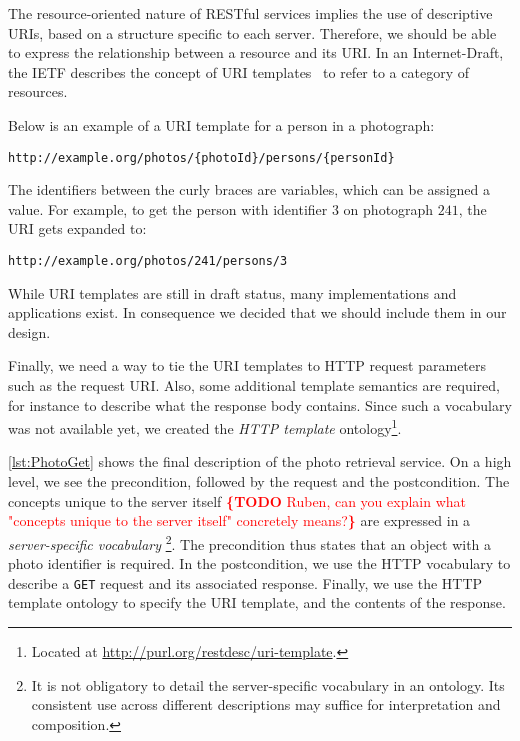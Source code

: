 \documentclass[runningheads,a4paper, twocolumn]{llncs}
\newcommand{\todo}[1]{\noindent\textcolor{red}{{\bf \{TODO} #1{\bf \}}}}
\begin{document}
The resource-oriented nature of RESTful services implies the use of descriptive URIs, based on a structure specific to each server. Therefore, we should be able to express the relationship between a resource and its URI. In an Internet-Draft, the IETF describes the concept of URI templates~\cite{URITemplate} to refer to a category of resources.

\needspace{2em} Below is an example of a URI template for a person in a photograph:
\begin{Verbatim}
http://example.org/photos/{photoId}/persons/{personId}
\end{Verbatim}
The identifiers between the curly braces are variables, which can be assigned a value. For example, to get the person with identifier $3$ on photograph $241$, the URI gets expanded to:
\begin{Verbatim}
http://example.org/photos/241/persons/3
\end{Verbatim}

While URI templates are still in draft status, many implementations and applications exist. In consequence we decided that we should include them in our design.

Finally, we need a way to tie the URI templates to HTTP request parameters such as the request URI. Also, some additional template semantics are required, for instance to describe what the response body contains. Since such a vocabulary was not available yet, we created the \emph{HTTP template} ontology\footnote{Located at {\fontsize{8}{10}\url{http://purl.org/restdesc/uri-template}}.}.

\autoref{lst:PhotoGet} shows the final description of the photo retrieval service. On a high level, we see the precondition, followed by the request and the postcondition. The concepts unique to the server itself \todo{Ruben, can you explain what "concepts unique to the server itself" concretely means?} are expressed in a \emph{server-specific vocabulary}
\footnote{It is not obligatory to detail the server-specific vocabulary in an ontology. Its consistent use across different descriptions may suffice for interpretation and composition.}.
The precondition thus states that an object with a photo identifier is required. In the postcondition, we use the HTTP vocabulary to describe a \Verb!GET! request and its associated response. Finally, we use the HTTP template ontology to specify the URI template, and the contents of the response.
\end{document}
